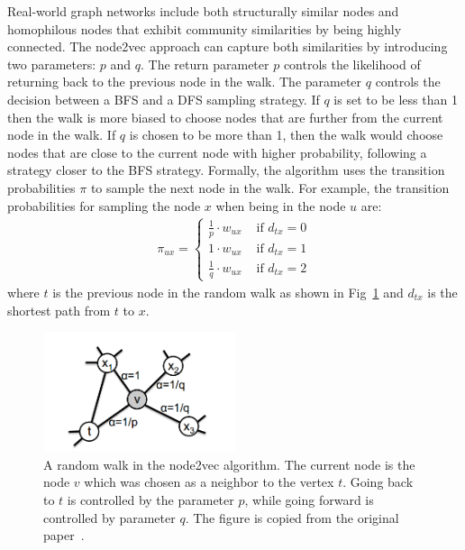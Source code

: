 Real-world graph networks include both structurally similar nodes and
homophilous nodes that exhibit community similarities by being highly connected.
The node2vec approach can capture both similarities by introducing two parameters:
$p$ and $q$. The return parameter $p$ controls the likelihood of returning back
to the previous node in the walk. The parameter $q$ controls the decision
between a BFS and a DFS sampling strategy. If $q$ is set to be less than 1
then the walk is more biased to choose nodes that are further from the current
node in the walk. If $q$ is chosen to be more than 1, then the walk would choose
nodes that are close to the current node with higher probability, following a
strategy closer to the BFS strategy. Formally, the algorithm uses the transition
probabilities $\pi$ to sample the next node in the walk. For example, the
transition probabilities for sampling the node $x$ when being in the node $u$ are:
\begin{align}
\pi_{ux} = \begin{cases} \frac{1}{p}\cdot w_{ux} & \text{ if } d_{tx} = 0 \\
1\cdot w_{ux} & \text{ if } d_{tx} = 1 \\
\frac{1}{q}\cdot w_{ux} & \text{ if } d_{tx} = 2
\end{cases}
\end{align}
where $t$ is the previous node in the random walk as shown in
Fig~\ref{node2vec_png} and $d_{tx}$ is the shortest path from $t$ to $x$.
\begin{figure}
\begin{center}
\includegraphics[width=0.5\textwidth]{figures/node2vec.png}
\end{center}
\caption{A random walk in the node2vec algorithm. The current node is the node
$v$ which was chosen as a neighbor to the vertex $t$.
Going back to $t$ is controlled by the parameter $p$, while going forward is
controlled by parameter $q$. The figure is copied from the original
paper~\cite{grover2016node2vec}.}
\label{node2vec_png}
\end{figure}

